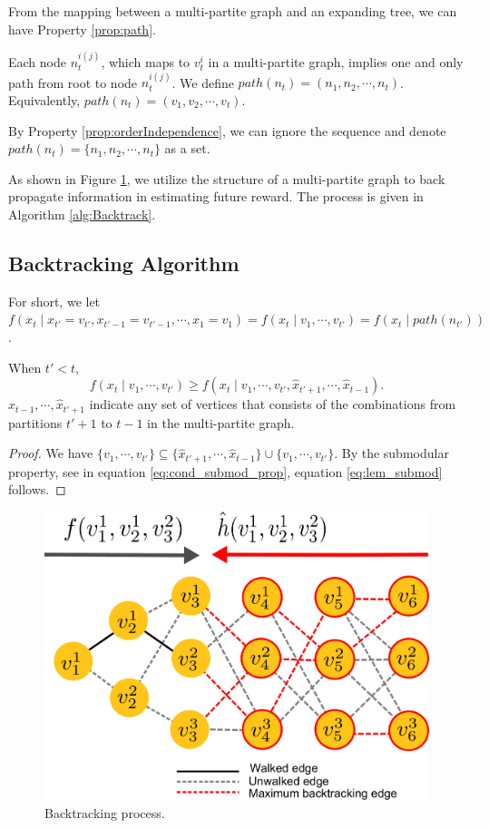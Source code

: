 \documentclass[12pt]{article}
\begin{document}
From the mapping between a multi-partite graph and an expanding tree, we can have Property \ref{prop:path}.

\begin{propty}
\label{prop:path}
Each node $ n_{t}^{i(j)} $, which maps to $ v_{t}^{i} $ in a multi-partite graph, implies one and only path from root to node $ n_{t}^{i(j)} $.
We define $ path(n_{t}) = ( n_{1}, n_{2} , \cdots , n_{t} ) $.
Equivalently, $ path(n_{t}) = ( v_{1}, v_{2} , \cdots , v_{t} ) $.
\end{propty}

By Property \ref{prop:orderIndependence}, we can ignore the sequence and denote $ path(n_{t}) = \{ n_{1}, n_{2} , \cdots , n_{t} \} $ as a set.

As shown in Figure \ref{fig:backtracking}, we utilize the structure of a multi-partite graph to back propagate information in estimating future reward. 
The process is given in Algorithm \ref{alg:Backtrack}.

\subsection{Backtracking Algorithm}
\label{subsec:backtrack_algorithm}

For short, we let $ f(x_{t} \mid x_{t'}=v_{t'}, x_{t'-1} = v_{t'-1} , \cdots  , x_{1} = v_{1} ) = f(x_{t} \mid v_{1}, \cdots , v_{t'}) = f(x_{t} \mid path(n_{t'})) $. 

\begin{lem}
\label{lem:submod}
When $ t' < t $, 
\begin{equation}
\label{eq:lem_submod}
f(x_{t} \mid v_{1} , \cdots , v_{t'} ) \geq f(x_{t} \mid v_{1} , \cdots , v_{t'} , \hat{x}_{t'+1} , \cdots , \hat{x}_{t-1}  ). 
\end{equation}
$ \hat{x}_{t-1} , \cdots , \hat{x}_{t'+1} $ indicate any set of vertices that consists of the combinations from partitions $ t'+1 $ to $ t - 1 $ in the multi-partite graph.
\begin{proof}
We have $ \{ v_{1} , \cdots , v_{t'} \} \subseteq \{ \hat{x}_{t'+1} , \cdots , \hat{x}_{t-1} \} \cup \{ v_{1} , \cdots , v_{t'} \} $.
By the submodular property, see in equation \eqref{eq:cond_submod_prop}, equation \eqref{eq:lem_submod} follows. 
\end{proof}
\end{lem}

\begin{figure}
\centering
\includegraphics[width=0.5\linewidth]{./images/backtracking.pdf}
\caption{Backtracking process.}
\label{fig:backtracking}
\end{figure}
\end{document}
